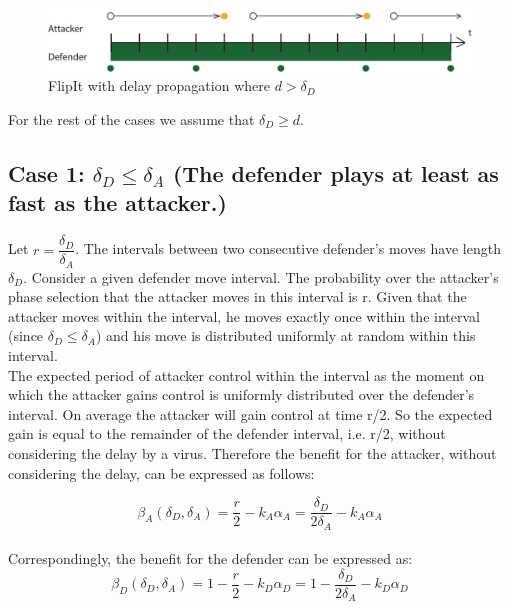\begin{figure}[hbtp]
\centering
\includegraphics[scale=0.7]{Images/FlipItCase1delaytobig.pdf} 
\caption{FlipIt with delay propagation where $ d > \delta_{D}$ }
\label{langeredelay}
\end{figure}

For the rest of the cases we assume that $\delta_{D} \geq d$.

\subsection*{\textbf{Case 1:} $\delta_{D} \leq \delta_{A} $ (The defender plays at least as fast as the attacker.) }

Let $r = \dfrac{\delta_{D}}{ \delta_{A} }$. The intervals between two consecutive defender's moves have length $\delta_{D}$. Consider a given defender move interval. The probability over the attacker's phase selection that the attacker moves in this interval is r. Given that the attacker moves within the interval, he moves exactly once within the interval (since $\delta_{D} \leq \delta_{A} $) and his move is distributed uniformly at random within this interval. \\

The expected period of attacker control within the interval as the moment on which the attacker gains control is uniformly distributed over the defender's interval. On average the attacker will gain control at time r/2. So the expected gain is equal to the remainder of the defender interval, i.e. r/2, without considering the delay by a virus. Therefore the benefit for the attacker, without considering the delay, can be expressed as follows:

\begin{equation*}
\beta_{A}(\delta_{D},\delta_{A}) =\dfrac {r} {2} - k_{A} \alpha_{A} = \dfrac {\delta_{D}} {2\delta_{A}} - k_{A} \alpha_{A}  
\end{equation*}\\

Correspondingly, the benefit for the defender can be expressed as:
\begin{equation*}
\beta_{D}(\delta_{D},\delta_{A}) =1 -  \dfrac {r} {2} - k_{D} \alpha_{D} = 1 - \dfrac {\delta_{D}} {2\delta_{A}} - k_{D} \alpha_{D} 
\end{equation*}


